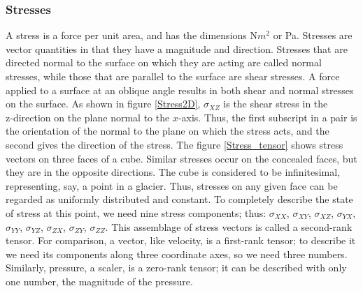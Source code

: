 \documentclass{article}
\begin{document}
\subsubsection{Stresses}
A stress is a force per unit area, and has the dimensions N$m^2$ or Pa. Stresses are vector quantities in that they have a magnitude and direction. Stresses that are directed normal to the surface on which they are acting are called normal stresses, while those that are parallel to the surface are shear stresses. A force applied to a surface at an oblique angle results in both shear and normal stresses on the surface.
As shown in figure \ref{Stress2D}, $\sigma_{XZ}$ is the shear stress in the z‑direction on the plane normal to the $x$-axis. Thus, the ﬁrst subscript in a pair is the orientation of the normal to the plane on which the stress acts, and the second gives the direction of the stress. The figure \ref{Stress_tensor} shows stress vectors on three faces of a cube. Similar stresses occur on the concealed faces, but they are in the opposite directions. The cube is considered to be inﬁnitesimal, representing, say, a point in a glacier. Thus, stresses on any given face can be regarded as uniformly distributed and constant. To completely describe the state of stress at this point, we need nine stress components; thus: $\sigma_{XX}$, $\sigma_{XY}$, $\sigma_{XZ}$, $\sigma_{YX}$, $\sigma_{YY}$, $\sigma_{YZ}$, $\sigma_{ZX}$, $\sigma_{ZY}$, $\sigma_{ZZ}$. This assemblage of stress vectors is called a second-rank tensor. For comparison, a vector, like velocity, is a ﬁrst-rank tensor; to describe it we need its components along three coordinate axes, so we need three numbers. Similarly, pressure, a scaler, is a zero-rank tensor; it can be described with only one number, the magnitude of the pressure.
\end{document}
